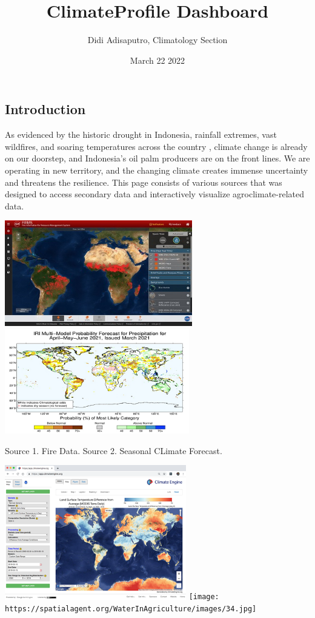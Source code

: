 \documentclass[
]{article}
\title{ClimateProfile Dashboard}
\author{Didi Adisaputro, Climatology Section}
\date{March 22 2022}
\begin{document}
\maketitle

\hypertarget{introduction}{%
\subsection{Introduction}\label{introduction}}

As evidenced by the historic drought in Indonesia, rainfall extremes,
vast wildfires, and soaring temperatures across the country , climate
change is already on our doorstep, and Indonesia's oil palm producers
are on the front lines. We are operating in new territory, and the
changing climate creates immense uncertainty and threatens the
resilience. This page consists of various sources that was designed to
access secondary data and interactively visualize agroclimate-related
data.

\href{https://firms2.modaps.eosdis.nasa.gov/map/\#d:2021-03-22..2021-03-23;@0.0,0.0,3z}{\includegraphics[width=3.21875in,height=\textheight]{fire_index.jpg}}
\href{https://iri.columbia.edu/our-expertise/climate/forecasts/seasonal-climate-forecasts/}{\includegraphics[width=3.16667in,height=\textheight]{Seasonal_Climate Forecast.png}}

Source 1. Fire Data. Source 2. Seasonal CLimate Forecast.

\href{https://iri.columbia.edu/our-expertise/climate/forecasts/seasonal-climate-forecasts/}{\includegraphics[width=3.11458in,height=\textheight]{climate_engine.png}}
\texttt{[image: https://spatialagent.org/WaterInAgriculture/images/34.jpg]}
\end{document}
